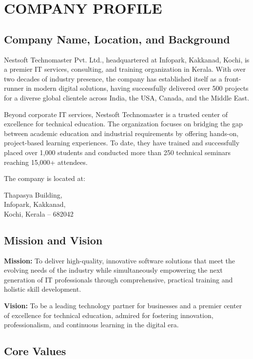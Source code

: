 \chapter{COMPANY PROFILE}

\section{Company Name, Location, and Background}
Nestsoft Technomaster Pvt. Ltd., headquartered at Infopark, Kakkanad, Kochi, is a premier IT services, consulting, and training organization in Kerala. With over two decades of industry presence, the company has established itself as a front-runner in modern digital solutions, having successfully delivered over 500 projects for a diverse global clientele across India, the USA, Canada, and the Middle East.

Beyond corporate IT services, Nestsoft Technomaster is a trusted center of excellence for technical education. The organization focuses on bridging the gap between academic education and industrial requirements by offering hands-on, project-based learning experiences. To date, they have trained and successfully placed over 1,000 students and conducted more than 250 technical seminars reaching 15,000+ attendees.

The company is located at:

\vspace{0.3cm}
\noindent Thapasya Building, \\
Infopark, Kakkanad, \\
Kochi, Kerala -- 682042
\section{Mission and Vision}

\textbf{Mission:} To deliver high-quality, innovative software solutions that meet the evolving needs of the industry while simultaneously empowering the next generation of IT professionals through comprehensive, practical training and holistic skill development.

\textbf{Vision:} To be a leading technology partner for businesses and a premier center of excellence for technical education, admired for fostering innovation, professionalism, and continuous learning in the digital era.

\section{Core Values}

